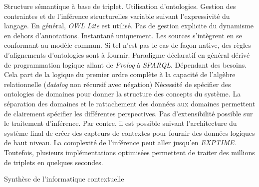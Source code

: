 \begin{table}[!ht]
\criteretabDonnee
    {Structure sémantique à base de triplet.}
    {Utilisation d'ontologies. Gestion des contraintes et de l'inférence structurelles variable suivant l'expressivité du langage. En général, \textit{OWL Lite} est utilisé.}
    {Pas de gestion explicite du dynamisme en dehors d'annotations.}
\criteretabTraitement
    {Instantané uniquement.}
    {Les sources s'intègrent en se conformant au modèle commun. Si tel n'est pas le cas de façon native, des règles d'alignements d'ontologies sont à fournir.}
    {Paradigme déclaratif en général dérivé de programmation logique allant de \textit{Prolog} à \textit{SPARQL}.}
    {Dépendant des besoins. Cela part de la logique du premier ordre complète à la capacité de l'algèbre relationnelle (\textit{datalog} non récursif avec négation)}
\criteretabAdaptabilite
    {Nécessité de spécifier des ontologies de domaines pour donner la structure des concepts du système.}
    {La séparation des domaines et le rattachement des données aux domaines permettent de clairement spécifier les différentes perspectives.}
    {Pas d'extensibilité possible sur le traitement d'inférence. Par contre, il est possible suivant l'architecture du système final de créer des capteurs de contextes pour fournir des données logiques de haut niveau.}
    {La complexité de l'inférence peut aller jusqu'en \textit{EXPTIME}. Toutefois, plusieurs implémentations optimisées permettent de traiter des millions de triplets en quelques secondes.}
\caption{Synthèse de l'informatique contextuelle}\label{tab:rw:supervision:contexte:synthese}
\end{table}